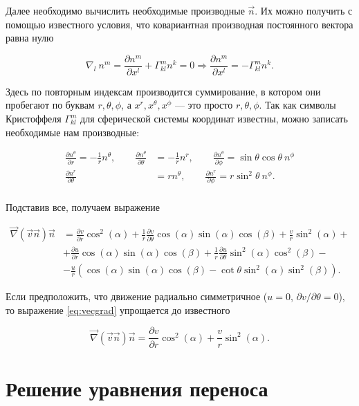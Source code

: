 \documentclass{article}
\begin{document}
Далее необходимо вычислить необходимые производные $\vec{n}$. Их можно получить с помощью известного условия, что ковариантная производная постоянного вектора равна нулю 

\[
\nabla_l\ n^m = \frac{\partial n^m}{\partial x^l} + \Gamma^m_{kl} n^k = 0 \Rightarrow \frac{\partial n^m}{\partial x^l} = -\Gamma^m_{kl} n^k.
\]

Здесь по повторным индексам производится суммирование, в котором они пробегают по буквам $r,\theta,\phi$, а $x^r, x^\theta, x^\phi$ --- это просто $r, \theta, \phi$. Так как символы Кристоффеля $\Gamma^m_{kl}$ для сферической системы координат известны, можно записать необходимые нам производные:

\[
\begin{aligned}
\frac{\partial n^\theta}{\partial r} = -\frac{1}{r}n^\theta, \qquad \frac{\partial n^\theta}{\partial \theta} &= -\frac{1}{r}n^r , \qquad \frac{\partial n^\theta}{\partial \phi} = \sin\theta\cos\theta\ n^\phi \\
\frac{\partial n^r}{\partial\theta} &= rn^\theta, \qquad \frac{\partial n^r}{\partial \phi} = r\sin^2\theta\ n^\phi. \\
\end{aligned}
\]

Подставив все, получаем выражение

\begin{align} \label{eq:vecgrad}
\vec{\nabla}(\vec{v}\vec{n})\vec{n} & = \frac{\partial v}{\partial r}\cos^2(\alpha) + \frac{1}{r}\frac{\partial v}{\partial \theta}\cos(\alpha)\sin(\alpha)\cos(\beta) + \frac{v}{r}\sin^2(\alpha) + \nonumber \\
& + \frac{\partial u}{\partial r} \cos(\alpha)\sin(\alpha)\cos(\beta) + \frac{1}{r}\frac{\partial u}{\partial \theta} \sin^2(\alpha)\cos^2(\beta) - \nonumber \\
& - \frac{u}{r}\left(\cos(\alpha)\sin(\alpha)\cos(\beta) - \cot\theta\sin^2(\alpha)\sin^2(\beta)\right).
\end{align}

Если предположить, что движение радиально симметричное ($u = 0$, $\partial v/\partial \theta = 0$), то выражение \eqref{eq:vecgrad} упрощается до известного

\[
\vec{\nabla}(\vec{v}\vec{n})\vec{n} = \frac{\partial v}{\partial r}\cos^2(\alpha) + \frac{v}{r}\sin^2(\alpha).
\] 

\section{Решение уравнения переноса}
\end{document}

